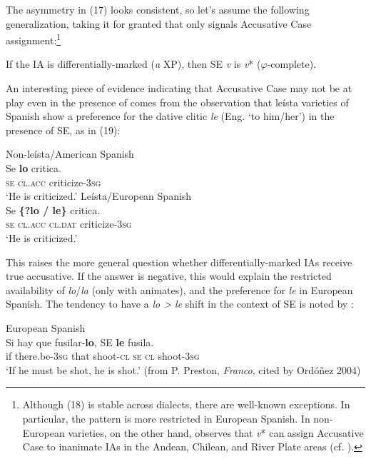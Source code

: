 \documentclass[output=paper]{langsci/langscibook}
\begin{document}
The asymmetry in (17) looks consistent, so let’s assume the following generalization, taking it for granted that only \DOM signals Accusative Case assignment:\footnote{Although (18) is stable across dialects, there are well-known exceptions. In particular, the pattern is more restricted in European Spanish. In non-European varieties, on the other hand, \citet[§41.12m]{RAE-ASALE2009} observes that \textit{v}* can assign Accusative Case to inanimate IAs in the Andean, Chilean, and River Plate areas (cf. \citealt{Gallego2016}).}

\ea%
\label{ex:gallego:18}
If the IA is differentially-marked (\textit{a} XP), then SE \textit{v} is \textit{v}* ($\varphi $-complete).
\z

          

An interesting piece of evidence indicating that Accusative Case may not be at play even in the presence of \DOM comes from the observation that leísta varieties of Spanish show a preference for the dative clitic \textit{le} (Eng. ‘to him/her’) in the presence of SE, as in (19):

\ea%
    \ea
    Non-leísta/American Spanish\label{ex:gallego:19}\\
    \gll Se  \textbf{lo}       critica.          \\
              \textsc{se  cl.acc} criticize\textsc{{}-3}\textsc{sg}\\
    \glt      ‘He is criticized.’
    \ex Leísta/European Spanish\\
    \gll Se \textbf{\{?lo    /    le\}}       critica.      \\
                 \textsc{se  cl.acc  cl.dat}   criticize\textsc{{}-3}\textsc{sg}\\
    \glt      ‘He is criticized.’
    \z
\z   

This raises the more general question whether differentially-marked IAs receive true accusative. If the answer is negative, this would explain the restricted availability of \textit{lo}/\textit{la} (only with animates), and the preference for \textit{le} in European Spanish. The tendency to have a \textit{lo > le} shift in the context of SE is noted by \citet{Ordóñez2004}:

\ea%
    European Spanish\label{ex:gallego:20}\\
    \gll Si hay                 que  fusilar-\textbf{lo},  SE \textbf{le} fusila.\\
        if  there.be\textsc{{}-3}\textsc{sg}  that  shoot\textsc{{}-cl  se  cl}  shoot\textsc{{}-3}\textsc{sg}\\
    \glt ‘If he must be shot, he is shot.’ (from P. Preston, \textit{Franco}, cited by Ordóñez 2004)
    \z
\end{document}

